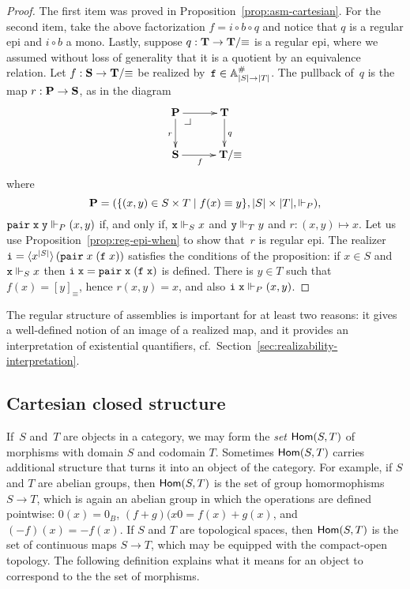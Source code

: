 \begin{proof}
  The first item was proved in Proposition~\ref{prop:asm-cartesian}.
  For the second item, take the above factorization $f = i \circ b
  \circ q$ and notice that $q$ is a regular epi and $i \circ b$ a
  mono. Lastly, suppose $q : \mathbf{T} \to \mathbf{T}/{\equiv}$ is a
  regular epi, where we assumed without loss of generality that it is
  a quotient by an equivalence relation. Let $f : \mathbf{S} \to
  \mathbf{T}/{\equiv}$ be realized by~$\mathtt{f} \in \mathbb{A}^{\#}_{|S| \to |T|}$.
  The pullback of~$q$ is the map $r : \mathbf{P} \to \mathbf{S}$, as in the
  diagram
  \begin{equation*}
    \xymatrix{
      {\asm{P}} \pbcorner
      \ar[r]
      \ar[d]_{r}
      &
      {\asm{T}}
      \ar[d]^{q}
      \\
      {\asm{S}}
      \ar[r]_{f}
      &
      **[r]{\asm{T}/{\equiv}}
      }
  \end{equation*}
  where
  \begin{equation*}
    \mathbf{P} = (\{(x,y) \in S \times T \mid f(x) \equiv y\},
               |S| \times |T|, {\Vdash_P}),
  \end{equation*}
  $\mathtt{pair}\;\mathtt{x}\;\mathtt{y} \Vdash_P (x,y)$ if, and only if, $\mathtt{x} \Vdash_S
  x$ and $\mathtt{y} \Vdash_T y$ and $r : (x,y) \mapsto x$. Let us use
  Proposition~\ref{prop:reg-epi-when} to show that~$r$ is regular epi.
  The realizer $\mathtt{i} =
  \langle x^{|S|} \rangle\,(\mathtt{pair}\;x\;(\mathtt{f}\;x))$ satisfies the
  conditions of the proposition: if $x \in S$ and $\mathtt{x} \Vdash_S x$ then
  $\mathtt{i}\;\mathtt{x} = \mathtt{pair}\;\mathtt{x}\;(\mathtt{f}\;\mathtt{x})$ is defined. There
  is $y \in T$ such that $f(x) = [y]_{\equiv}$, hence $r (x, y) = x$,
  and also $\mathtt{i}\;\mathtt{x} \Vdash_P (x, y)$.
\end{proof}

The regular structure of assemblies is important for at least two
reasons: it gives a well-defined notion of an image of a realized map,
and it provides an interpretation of existential quantifiers, cf.\
Section~\ref{sec:realizability-interpretation}.


\subsection{Cartesian closed structure}
\label{sec:ccc}


If~$S$ and~$T$ are objects in a category, we may form the \emph{set}
$\mathsf{Hom}(S, T)$ of morphisms with domain $S$ and codomain $T$. Sometimes
$\mathsf{Hom}(S, T)$ carries additional structure that turns it into an object
of the category. For example, if $S$ and $T$ are abelian groups, then
$\mathsf{Hom}(S,T)$ is the set of group homormophisms $S \to T$, which is
again an abelian group in which the operations are defined pointwise:
$0(x) = 0_B$, $(f + g)(x0 = f(x) + g(x)$, and $(-f)(x) = -f(x)$. If
$S$ and $T$ are topological spaces, then $\mathsf{Hom}(S,T)$ is the set of
continuous maps $S \to T$, which may be equipped with the compact-open
topology. The following definition explains what it means for an
object to correspond to the the set of morphisms.

